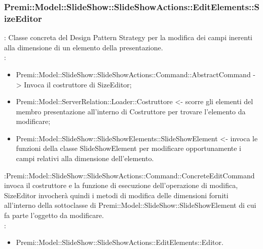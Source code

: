 {    \subsubsection{Premi::Model::SlideShow::SlideShowActions::EditElements::SizeEditor}{
				\textbf{\tipo}: Classe concreta del Design Pattern Strategy per la modifica dei campi inerenti alla dimensione di un elemento della presentazione.\\	
				\textbf{\relaz}: 
				\begin{itemize}
					\item Premi::Model::SlideShow::SlideShowActions::Command::AbstractCommand -> Invoca il costruttore di SizeEditor;
                    \item Premi::Model::ServerRelation::Loader::Costruttore <- scorre gli elementi del membro presentazione all'interno di Costruttore per trovare l'elemento da modificare; 
                    \item Premi::Model::SlideShow::SlideShowElements::SlideShowElement <- invoca le funzioni della classe SlideShowElement per modificare opportunamente i campi relativi alla dimensione dell’elemento.
				\end{itemize}	\textbf{\interfacce}:Premi::Model::SlideShow::SlideShowActions::Command::ConcreteEditCommand invoca il costruttore e la funzione di esecuzione dell’operazione di modifica, SizeEditor invocherà quindi i metodi di modifica delle dimensioni forniti all’interno della sottoclasse di Premi::Model::SlideShow::SlideShowElement di cui fa parte l’oggetto da modificare.\\
                \textbf{\base}: 
                    \begin{itemize}
                    \item Premi::Model::SlideShow::SlideShowActions::EditElements::Editor.
                    \end{itemize}
                    }
}
